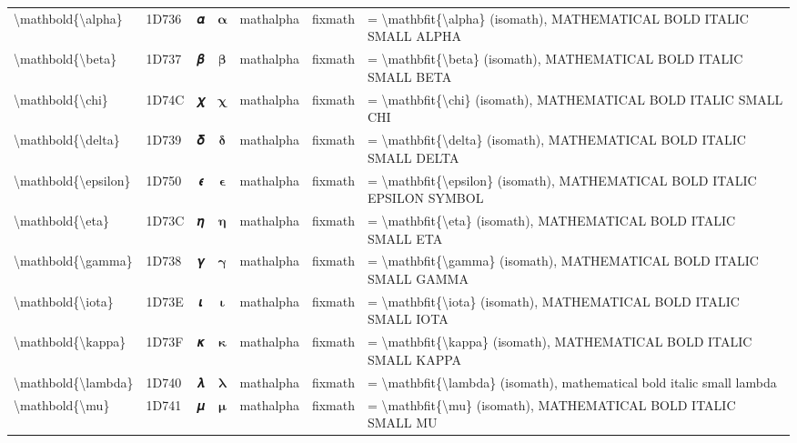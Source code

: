 \documentclass[a4paper,landscape]{article}
\begin{document}
\begin{longtable}{llcclll}
\textbackslash{}mathbold\{\textbackslash{}alpha\} & 1D736 & 𝜶 & $\mathbold{\alpha}$ & mathalpha & fixmath & = \textbackslash{}mathbfit\{\textbackslash{}alpha\} (isomath),  MATHEMATICAL BOLD ITALIC SMALL ALPHA \\
\textbackslash{}mathbold\{\textbackslash{}beta\} & 1D737 & 𝜷 & $\mathbold{\beta}$ & mathalpha & fixmath & = \textbackslash{}mathbfit\{\textbackslash{}beta\} (isomath),  MATHEMATICAL BOLD ITALIC SMALL BETA \\
\textbackslash{}mathbold\{\textbackslash{}chi\} & 1D74C & 𝝌 & $\mathbold{\chi}$ & mathalpha & fixmath & = \textbackslash{}mathbfit\{\textbackslash{}chi\} (isomath),  MATHEMATICAL BOLD ITALIC SMALL CHI \\
\textbackslash{}mathbold\{\textbackslash{}delta\} & 1D739 & 𝜹 & $\mathbold{\delta}$ & mathalpha & fixmath & = \textbackslash{}mathbfit\{\textbackslash{}delta\} (isomath),  MATHEMATICAL BOLD ITALIC SMALL DELTA \\
\textbackslash{}mathbold\{\textbackslash{}epsilon\} & 1D750 & 𝝐 & $\mathbold{\epsilon}$ & mathalpha & fixmath & = \textbackslash{}mathbfit\{\textbackslash{}epsilon\} (isomath),  MATHEMATICAL BOLD ITALIC EPSILON SYMBOL \\
\textbackslash{}mathbold\{\textbackslash{}eta\} & 1D73C & 𝜼 & $\mathbold{\eta}$ & mathalpha & fixmath & = \textbackslash{}mathbfit\{\textbackslash{}eta\} (isomath),  MATHEMATICAL BOLD ITALIC SMALL ETA \\
\textbackslash{}mathbold\{\textbackslash{}gamma\} & 1D738 & 𝜸 & $\mathbold{\gamma}$ & mathalpha & fixmath & = \textbackslash{}mathbfit\{\textbackslash{}gamma\} (isomath),  MATHEMATICAL BOLD ITALIC SMALL GAMMA \\
\textbackslash{}mathbold\{\textbackslash{}iota\} & 1D73E & 𝜾 & $\mathbold{\iota}$ & mathalpha & fixmath & = \textbackslash{}mathbfit\{\textbackslash{}iota\} (isomath),  MATHEMATICAL BOLD ITALIC SMALL IOTA \\
\textbackslash{}mathbold\{\textbackslash{}kappa\} & 1D73F & 𝜿 & $\mathbold{\kappa}$ & mathalpha & fixmath & = \textbackslash{}mathbfit\{\textbackslash{}kappa\} (isomath),  MATHEMATICAL BOLD ITALIC SMALL KAPPA \\
\textbackslash{}mathbold\{\textbackslash{}lambda\} & 1D740 & 𝝀 & $\mathbold{\lambda}$ & mathalpha & fixmath & = \textbackslash{}mathbfit\{\textbackslash{}lambda\} (isomath),  mathematical bold italic small lambda \\
\textbackslash{}mathbold\{\textbackslash{}mu\} & 1D741 & 𝝁 & $\mathbold{\mu}$ & mathalpha & fixmath & = \textbackslash{}mathbfit\{\textbackslash{}mu\} (isomath),  MATHEMATICAL BOLD ITALIC SMALL MU \\

\end{longtable}
\end{document}
